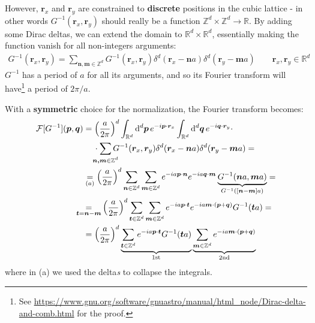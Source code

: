 \documentclass[../../main.tex]{subfiles}
\begin{document}
However, $\bm{r}_x$ and $\bm{r}_y$ are constrained to \textbf{discrete} positions in the cubic lattice - in other words $G^{-1}(\bm{r}_x, \bm{r}_y)$ should really be a function $\mathbb{Z}^{d}\times \mathbb{Z}^d \to \mathbb{R}$. By adding some Dirac deltas, we can extend the domain to $\mathbb{R}^d \times \mathbb{R}^d$, essentially making the function vanish for all non-integers arguments:
\begin{align*}
    G^{-1}(\bm{r}_x, \bm{r}_y) = \sum_{\bm{n,m} \in \mathbb{Z}^d} G^{-1}(\bm{r}_x, \bm{r}_y) \delta^d(\bm{r}_x-\bm{n}a) \delta^d(\bm{r}_y - \bm{m} a) \qquad \bm{r}_x, \bm{r}_y \in \mathbb{R}^d
\end{align*}
$G^{-1}$ has a period of $a$ for all its arguments, and so its Fourier transform will have\footnote{See \url{https://www.gnu.org/software/gnuastro/manual/html_node/Dirac-delta-and-comb.html} for the proof.} a period of $2\pi/a$.

With a \textbf{symmetric} choice for the normalization, the Fourier transform becomes:
\begin{align*}
    \mathcal{F}[G^{-1}](\bm{p}, \bm{q}) &= \left(\frac{a}{2\pi} \right)^d \int_{\mathbb{R}^d} \dd[d]{\bm{p}} e^{-i \bm{p} \cdot \bm{r}_x} \int_{\mathbb{R}^d} \dd[d]{\bm{q}} e^{-i \bm{q} \cdot \bm{r}_y} \cdot \\* %
    &\quad\>\cdot \sum_{\mathclap{\bm{n,m} \in \mathbb{Z}^d}} G^{-1}(\bm{r}_x, \bm{r}_y) \delta^d(\bm{r}_x-\bm{n}a) \delta^d(\bm{r}_y - \bm{m} a) =\\
    &\underset{(a)}{=}  \left(\frac{a}{2\pi} \right)^d  \sum_{\bm{n} \in \mathbb{Z}^d} \sum_{\bm{m} \in \mathbb{Z}^d} e^{-i a \bm{p}\cdot \bm{n}} e^{-i a \bm{q} \cdot \bm{m}} \underbrace{G^{-1}(\bm{n}a, \bm{m}a)}_{G^{-1}([\bm{n}-\bm{m}]a)} = \\
    &\underset{\mathclap{\bm{t} = \bm{n}- \bm{m}}}{=}\quad \left(\frac{a}{2\pi} \right)^d    \sum_{\bm{t} \in \mathbb{Z}^d} \sum_{\bm{m} \in \mathbb{Z}^d} e^{-i a \bm{p} \cdot \bm{t}} e^{-i a \bm{m} \cdot (\bm{p} + \bm{q})} G^{-1}(\bm{t}a) =\\
    &=  \left(\frac{a}{2\pi} \right)^d \underbrace{\sum_{\bm{t} \in \mathbb{Z}^d} e^{-i a \bm{p} \cdot \bm{t}} G^{-1}(\bm{t} a)}_{1\mathrm{st}} \underbrace{\sum_{\bm{m} \in \mathbb{Z}^d} e^{-i a \bm{m} \cdot (\bm{p} + \bm{q})}}_{2\mathrm{nd}}
\end{align*} 
where in (a) we used the delta\textit{s} to collapse the integrals.
\end{document}
